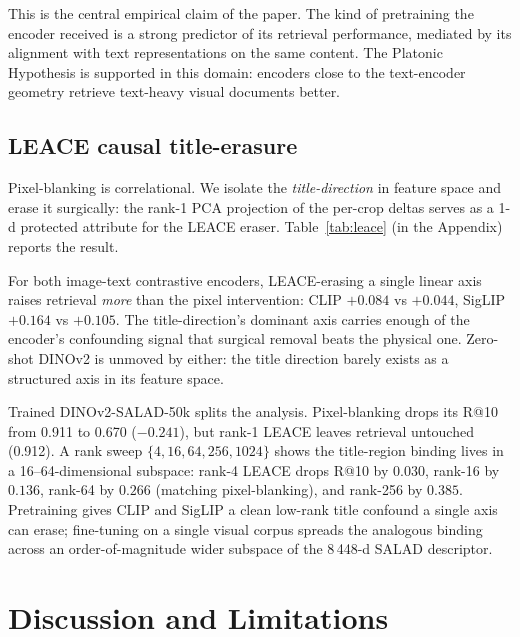 \documentclass{article}
\begin{document}
This is the central empirical claim of the paper. The kind of
pretraining the encoder received is a strong predictor of its
retrieval performance, mediated by its alignment with text
representations on the same content. The Platonic Hypothesis is
supported in this domain: encoders close to the text-encoder
geometry retrieve text-heavy visual documents better.

\subsection{LEACE causal title-erasure}
\label{sec:leace}

Pixel-blanking is correlational. We isolate the
\emph{title-direction} in feature space and erase it surgically:
the rank-1 PCA projection of the per-crop deltas serves as a 1-d
protected attribute for the LEACE eraser. Table~\ref{tab:leace}
(in the Appendix) reports the result.

For both image-text contrastive encoders, LEACE-erasing a single
linear axis raises retrieval \emph{more} than the pixel
intervention: CLIP $+0.084$ vs $+0.044$, SigLIP $+0.164$ vs $+0.105$.
The title-direction's dominant axis carries enough of the encoder's
confounding signal that surgical removal beats the physical one.
Zero-shot DINOv2 is unmoved by either: the title direction barely
exists as a structured axis in its feature space.

Trained DINOv2-SALAD-50k splits the analysis. Pixel-blanking drops
its R@10 from 0.911 to 0.670 ($-0.241$), but rank-1 LEACE leaves
retrieval untouched (0.912). A rank sweep
$\{4, 16, 64, 256, 1024\}$ shows the title-region binding lives
in a 16--64-dimensional subspace: rank-4 LEACE drops R@10 by
$0.030$, rank-16 by $0.136$, rank-64 by $0.266$ (matching
pixel-blanking), and rank-256 by $0.385$. Pretraining gives CLIP
and SigLIP a clean low-rank title confound a single axis can
erase; fine-tuning on a single visual corpus spreads the analogous
binding across an order-of-magnitude wider subspace of the 8\,448-d
SALAD descriptor.

\section{Discussion and Limitations}
\label{sec:disc}
\end{document}
